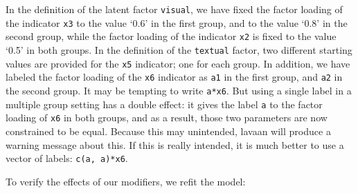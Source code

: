 In the definition of the latent factor \texttt{visual}, we have fixed
the factor loading of the indicator \texttt{x3} to the value `0.6' in
the first group, and to the value `0.8' in the second group, while the
factor loading of the indicator \texttt{x2} is fixed to the value `0.5'
in both groups. In the definition of the \texttt{textual} factor, two
different starting values are provided for the \texttt{x5} indicator;
one for each group. In addition, we have labeled the factor loading of
the \texttt{x6} indicator as \texttt{a1} in the first group, and
\texttt{a2} in the second group. It may be tempting to write
\texttt{a*x6}. But using a single label in a multiple group setting has
a double effect: it gives the label \texttt{a} to the factor loading of
\texttt{x6} in both groups, and as a result, those two parameters are
now constrained to be equal. Because this may unintended, lavaan will
produce a warning message about this. If this is really intended, it is
much better to use a vector of labels: \texttt{c(a,\ a)*x6}.

To verify the effects of our modifiers, we refit the model:

\begin{Shaded}
\begin{Highlighting}[]
\OtherTok{\textless{}{-}} 
            \NormalTok{)}
\end{Highlighting}
\end{Shaded}

